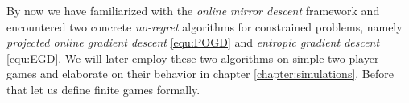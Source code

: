 By now we have familiarized with the \textit{online mirror descent} framework and encountered two concrete \textit{no-regret} algorithms for constrained problems, namely \textit{projected online gradient descent} \ref{equ:POGD} and \textit{entropic gradient descent} \ref{equ:EGD}. We will later employ these two algorithms on simple two player games and elaborate on their behavior in chapter \ref{chapter:simulations}. Before that let us define finite games formally. 

